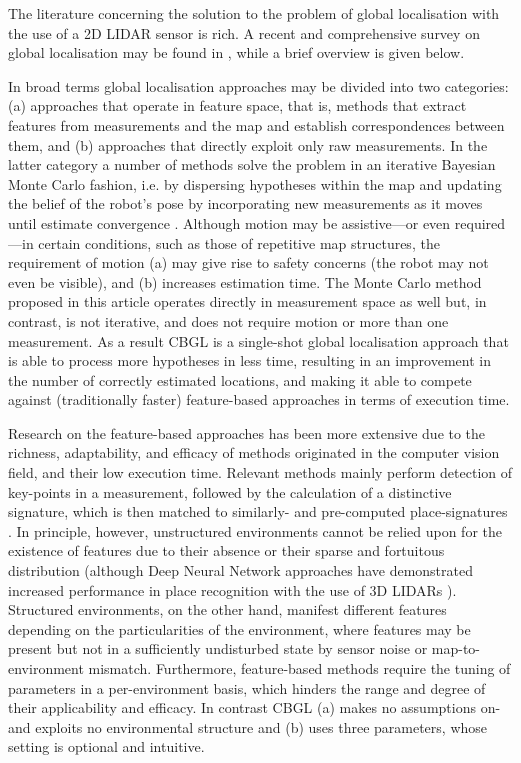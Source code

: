 The literature concerning the solution to the problem of global localisation
with the use of a 2D LIDAR sensor is rich. A recent and comprehensive survey on
global localisation may be found in \cite{gl_survey_cn}, while a brief overview
is given below.

In broad terms global localisation approaches may be divided into two
categories: (a) approaches that operate in feature space, that is, methods that
extract features from measurements and the map and establish correspondences
between them, and (b) approaches that directly exploit only raw measurements.
In the latter category a number of methods solve the problem in an iterative
Bayesian Monte Carlo fashion, i.e. by dispersing hypotheses within the map and
updating the belief of the robot's pose by incorporating new measurements as it
moves until estimate convergence
\cite{mcl,Wang2018d,Yilmaz2019a,gmcl,Chen2021a}.
Although motion may be assistive---or even required---in certain conditions,
such as those of repetitive map structures, the requirement of motion (a) may
give rise to safety concerns (the robot may not even be visible), and (b)
increases estimation time. The Monte Carlo method proposed in this article
operates directly in measurement space as well but, in contrast, is not
iterative, and does not require motion or more than one measurement. As a
result CBGL is a single-shot global localisation approach that is able to
process more hypotheses in less time, resulting in an improvement in the number
of correctly estimated locations, and making it able to compete against
(traditionally faster) feature-based approaches in terms of execution time.

Research on the feature-based approaches has been more extensive due to the
richness, adaptability, and efficacy of methods originated in the computer
vision field, and their low execution time. Relevant methods mainly perform
detection of key-points in a measurement, followed by the calculation of a
distinctive signature, which is then matched to similarly- and pre-computed
place-signatures
\cite{Kallasi2016a,als_eth,Usman2019,Wang2021b,Meng2021,Hendrikx2021,An2022,Nielsen2023}.
In principle, however, unstructured environments cannot be relied upon for the
existence of features due to their absence or their sparse and fortuitous
distribution (although Deep Neural Network approaches have demonstrated
increased performance in place recognition with the use of 3D LIDARs
\cite{Xu2021,Yin2022,Komorowski2022}). Structured environments, on the other
hand, manifest different features depending on the particularities of the
environment, where features may be present but not in a sufficiently
undisturbed state by sensor noise or map-to-environment mismatch. Furthermore,
feature-based methods require the tuning of parameters in a per-environment
basis, which hinders the range and degree of their applicability and efficacy.
In contrast CBGL (a) makes no assumptions on- and exploits no environmental
structure and (b) uses three parameters, whose setting is optional and
intuitive.

